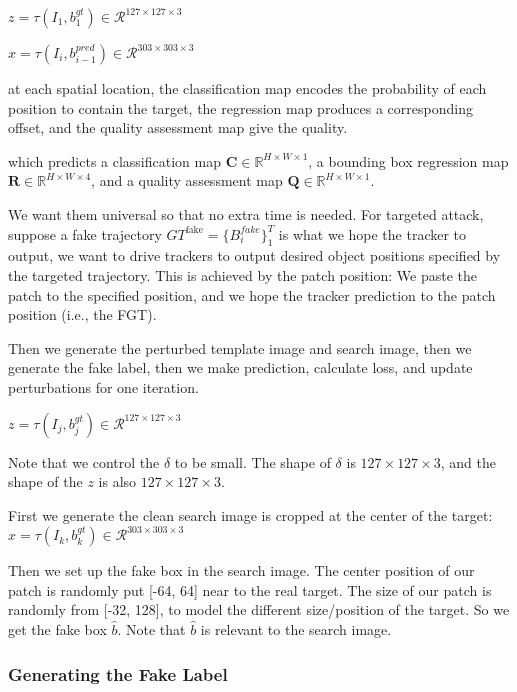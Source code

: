 \documentclass{article}
\begin{document}
$z = \tau (I_1, b^{gt}_1)\in \mathcal{R}^{127\times 127\times 3}$

$x = \tau(I_i, b_{i-1}^{pred})\in \mathcal{R}^{303\times 303 \times 3}$

at each spatial location, the classification map encodes the probability of each position to contain the target, the regression map produces a corresponding offset, and the quality assessment map give the quality. 

which predicts a classification map $\textbf{C}\in \mathbb{R}^{H\times W\times 1}$, a bounding box regression map $\textbf{R}\in \mathbb{R}^{H\times W\times 4}$, and a quality assessment map $\textbf{Q}\in \mathbb{R}^{H\times W\times 1}$.

We want them universal so that no extra time is needed.
For targeted attack, suppose a fake trajectory $GT^{\text{fake}}=\{B^{fake}_i\}_1^T$ is what we hope the tracker to output, we want to drive trackers to output desired object positions specified by the targeted trajectory. This is achieved by the patch position: We paste the patch to the specified position, and we hope the tracker prediction to the patch position (i.e., the FGT).

Then we generate the perturbed template image and search image, then we generate the fake label, then we make prediction, calculate loss, and update perturbations for one iteration.

$z = \tau (I_j, b^{gt}_j)\in \mathcal{R}^{127\times 127\times 3}$

Note that we control the $\delta$ to be small. The shape of $\delta$ is $127 \times 127 \times 3$, and the shape of the $z$ is also $127 \times 127 \times 3$.

First we generate the clean search image is cropped at the center of the target:$x = \tau(I_k, b_{k}^{gt})\in \mathcal{R}^{303\times 303 \times 3}$

Then we set up the fake box in the search image. The center position of our patch is randomly put [-64, 64] near to the real target. The size of our patch is randomly from [-32, 128], to model the different size/position of the target. So we get the fake box $\hat b$. Note that $\hat b$ is relevant to the search image.

\subsubsection{Generating the Fake Label}
\end{document}
